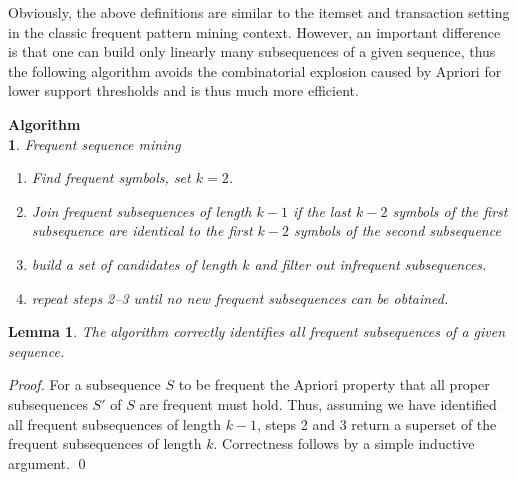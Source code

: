 \documentclass{llncs}
\newtheorem{lemmx}{Lemma}
\newtheorem{algx}{Algorithm{\\}}
\begin{document}
Obviously, the above definitions are similar to the itemset and transaction setting in the classic frequent pattern mining context. However, an important difference is that one can build only linearly many subsequences of a given sequence, thus the following algorithm avoids the combinatorial explosion caused by Apriori for lower support thresholds and is thus much more efficient. %
\\
\begin{algx} {Frequent sequence mining}
\begin{enumerate}
\item Find frequent symbols, set $k=2$.
\item Join frequent subsequences of length $k-1$ if the last $k-2$ symbols of the first subsequence are identical to the first $k-2$ symbols of the second subsequence
\item build a set of candidates of length $k$ and filter out infrequent subsequences.
\item repeat steps 2--3 until no new frequent subsequences can be obtained.
\end{enumerate}
\end{algx}
\begin{lemmx}
The algorithm correctly identifies all frequent subsequences of a given sequence.
\end{lemmx}
\begin{proof}
For a subsequence $S$ to be frequent the Apriori property that all proper subsequences $S'$ of $S$ are frequent must hold. Thus, assuming we have identified all frequent subsequences of length $k-1$, steps 2 and 3 return a superset of the frequent subsequences of length $k$. Correctness follows by a simple inductive argument. \qed
\end{proof}
\end{document}
